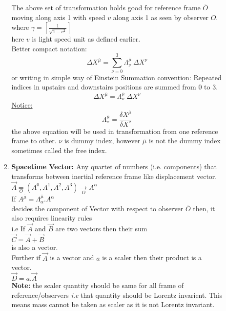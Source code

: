 \documentclass[11pt,a4paper]{article}
\begin{document}
\begin{enumerate}
\begin{enumerate}
\begin{enumerate}
			                  The above set of transformation holds good for reference frame $\overline{O}$ moving along axis 1 with speed $v$ along axis 1 as seen by observer $O$.\\
			                  where $\gamma  = \left[\frac{1}{\sqrt{1-v^2}}\right]$\\
			                  here $v$ is light speed unit as defined earlier.\\
			                  Better compact notation:\\
			                  \[\Delta X^{\overline{\mu}}=\sum_{\nu = 0}^{3}\Lambda^{\overline{\mu}}_{\nu}\ \Delta X^{\nu}\]
			                  or  writing in simple way of Einstein Summation convention: Repeated indices in upstairs and downstairs positions are summed from 0 to 3.
			                  \[\Delta X^{\overline{\mu}}=\Lambda^{\overline{\mu}}_{\nu}\ \Delta X^{\nu}\]
			                  \underline{Notice:}\[\Lambda^{\overline{\mu}}_{\nu}=\frac{\delta X^{\overline{\mu}}}{ \delta X^{\nu}}\]
			                  the above equation will be used in transformation from one reference frame to other.
			                  $\nu$ is dummy index, however $\overline{\mu}$ is not the dummy index sometimes called the free index.\\
			            \item \textbf{Spacetime Vector:} Any quartet of numbers (i.e. components) that transforms between inertial reference frame like displacement vector.\\
			                  $\vec{A} \mathop = \limits^{}_{O} \left(A^0,A^1,A^2,A^3\right)\mathop \rightarrow \limits^{}_{O} {A^{\alpha}}$\\
			                  If $A^{\overline{\mu}}=\Lambda^{\overline{\mu}}_{\alpha}.A^{\alpha}$\\ decides the component of Vector with respect to observer $\overline{O}$ then, it also requires linearity rules\\
			                  i.e If $\vec{A}$ and $\vec{B}$ are two vectors then their sum\\
			                  $\vec{C}=\vec{A}+\vec{B}$\\
			                  is also a vector.\\
			                  Further if $\vec{A}$ is a vector and $a$ is a scaler then their product is a vector.\\
			                  $\vec{D}=a.\vec{A}$\\
			                  \textbf{Note:} the scaler quantity should be same for all frame of reference/observers \textit{i.e} that quantity should be Lorentz invarient. This means mass cannot be taken as scaler as it is not Lorentz invariant.\newline
		            \end{enumerate}
	      \end{enumerate}


\end{enumerate}
\end{document}
